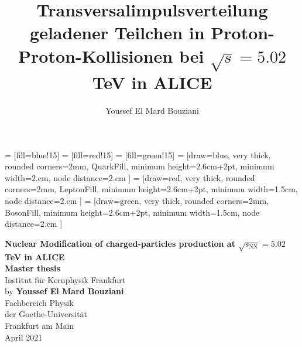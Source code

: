 \documentclass[12pt,a4paper]{report}
\author{Youssef El Mard Bouziani}
\title{Transversalimpulsverteilung geladener Teilchen in Proton-Proton-Kollisionen bei  $\sqrt{s} = 5.02$ TeV in ALICE}
\begin{document}
\newcommand{\Quark}[5]
{
  \begin{minipage}{0.cm}
      {\hfill \footnotesize \text{ #3} }
  \end{minipage}
 {\raisebox{40pt}{\makebox[1em][l]{\footnotesize \textbf{#1}}}%
 \hspace{2.3cm} \raisebox{40pt}{\makebox[3em][l]{\footnotesize \textbf{#2} }} \hspace{-3.1cm} 
 \parbox[t][1em]{3em}{\centering{\fontsize{40}{40}\selectfont  #4}	}\hspace*{1em}   %
    \parbox[c][6em]{0em}{\vspace{1.4cm}\hspace{-2.7cm}\centering \footnotesize \textbf{#5}}   
}
}
   = [fill=blue!15]
   = [fill=red!15]
   = [fill=green!15]
   = [draw=blue, very thick, rounded corners=2mm, QuarkFill,  minimum height={2.6cm+2pt}, minimum width=2.cm, node distance=2.cm ]
     = [draw=red, very thick, rounded corners=2mm, LeptonFill,  minimum height={2.6cm+2pt}, minimum width=1.5cm, node distance=2.cm ]
     = [draw=green, very thick, rounded corners=2mm, BosonFill,  minimum height={2.6cm+2pt}, minimum width=1.5cm, node distance=2.cm ]
   
\newcommand{\pt}{$p_\text{T}$ }
\newcommand{\raa}{$R_\text{AA}$ }
\newcommand{\rled}{$R_\text{PbPb}$ }

\begin{titlepage}
\begin{center}

\vspace*{4cm}  

\huge{\textbf{Nuclear Modification of charged-particles production at $\sqrt{s_\text{NN}} = 5.02$ TeV in ALICE}}\\[2cm]
\vfill
\Large{\textbf{Master thesis}}\\
Institut für Kernphysik Frankfurt\\
\vfill
by \Large{\textbf{Youssef El Mard Bouziani}}\\[1cm]
\vfill
Fachbereich Physik\\
der Goethe-Universität\\
Frankfurt am Main\\
\vspace*{1cm}
April 2021
\end{center}
\end{titlepage}
\end{document}
